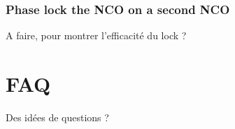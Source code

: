 \documentclass[12pt,oneside]{article}
\begin{document}
\subsubsection{Phase lock the NCO on a second NCO}

A faire, pour montrer l'efficacité du lock ?

\section{FAQ}

Des idées de questions ?
\end{document}
